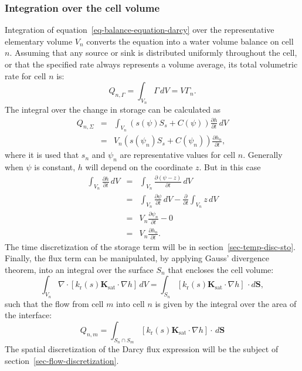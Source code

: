 \documentclass[fleqn]{article}
\begin{document}
\subsubsection*{Integration over the cell volume}
Integration of equation~\ref{eq-balance-equation-darcy} over the representative
elementary volume $V_n$ converts the equation into a water volume balance
on cell $n$. Assuming that any source or sink is distributed uniformly
throughout the cell, or that the specified rate always represents a volume
average, its total volumetric rate for cell $n$ is:
\begin{equation}
  Q_{n, \Gamma} = \int_{V_n} \Gamma \,dV = V \Gamma_n.
\end{equation}
The integral over the change in storage can be calculated as
\begin{eqnarray}
  Q_{n,\Sigma} 
    &=& \int_{V_n} \left( s(\psi) S_s  + C(\psi) \right)
      \frac{\partial h}{\partial t} \,dV \\
    &=& V_n  \left( s(\psi_n) S_s  + C(\psi_n) \right)
      \frac{\partial h_n}{\partial t},
\end{eqnarray}
where it is used that $s_n$ and $\psi_n$ are representative values for
cell $n$. Generally when $\psi$ is constant, $h$ will depend on the 
coordinate $z$. But in this case
\begin{eqnarray}
  \int_{V_n} \frac{\partial h}{\partial t} \,dV 
    &=& \int_{V_n} \frac{\partial (\psi - z)}{\partial t} \,dV \\
    &=& \int_{V_n} \frac{\partial \psi}{\partial t} \,dV - 
        \frac{\partial}{\partial t} \int_{V_n} z \,dV \\
    &=& V_n \frac{\partial \psi_n}{\partial t} - 0 \\
    &=& V_n \frac{\partial h_n}{\partial t}.
\end{eqnarray}
The time discretization of the storage term will be in 
section~\ref{sec-temp-disc-sto}. Finally, the flux term
can be manipulated, by applying Gauss' divergence theorem,
into an integral over the surface $S_n$ that encloses the 
cell volume:
\begin{equation}  
  \int_{V_n} \nabla \cdot \left[ 
    k_\text{r}(s) \mathbf{K}_{\textrm{sat}} \cdot \nabla h \right] \,dV =
      \int_{S_n} \left[ 
      k_\text{r}(s) \mathbf{K}_{\textrm{sat}} \cdot \nabla h \right] \,\cdot d\mathbf{S},
\end{equation}
such that the flow from cell $m$ into cell $n$ is given by the
integral over the area of the interface:
\begin{equation}
  Q_{n,m} = \int_{S_n \cap S_m} \left[ k_\text{r}(s) \mathbf{K}_{\textrm{sat}} 
    \cdot \nabla h \right] \cdot \,d\mathbf{S}
\end{equation} 
The spatial discretization of the Darcy flux expression will be the
subject of section~\ref{sec-flow-discretization}.
\end{document}
